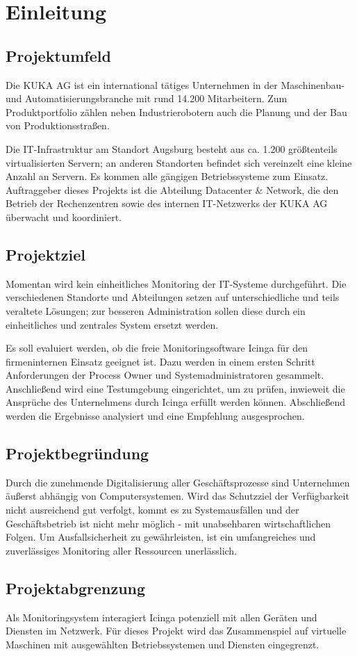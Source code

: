 \section{Einleitung}
\label{sec:Einleitung}

\subsection{Projektumfeld} 
\label{sec:Projektumfeld}
Die KUKA AG ist ein international tätiges Unternehmen in der Maschinenbau- und Automatisierungsbranche mit rund 14.200 Mitarbeitern. Zum Produktportfolio zählen neben Industrierobotern auch die Planung und der Bau von Produktionsstraßen.

Die IT-Infrastruktur am Standort Augsburg besteht aus ca. 1.200 größtenteils virtualisierten Servern; an anderen Standorten befindet sich vereinzelt eine kleine Anzahl an Servern. Es kommen alle gängigen Betriebssysteme zum Einsatz. Auftraggeber dieses Projekts ist die Abteilung \glqq Datacenter \& Network\grqq{}, die den Betrieb der Rechenzentren sowie des internen IT-Netzwerks der KUKA AG überwacht und koordiniert.

\subsection{Projektziel} 
\label{sec:Projektziel}
Momentan wird kein einheitliches Monitoring der IT-Systeme durchgeführt. Die verschiedenen Standorte und Abteilungen setzen auf unterschiedliche und teils veraltete Lösungen; zur besseren Administration sollen diese durch ein einheitliches und zentrales System ersetzt werden.

Es soll evaluiert werden, ob die freie Monitoringsoftware \glqq Icinga\grqq{} für den firmeninternen Einsatz geeignet ist. Dazu werden in einem ersten Schritt Anforderungen der Process Owner und Systemadministratoren gesammelt. Anschließend wird eine Testumgebung eingerichtet, um zu prüfen, inwieweit die Ansprüche des Unternehmens durch \glqq Icinga\grqq{} erfüllt werden können. Abschließend werden die Ergebnisse analysiert und eine Empfehlung ausgesprochen.

\subsection{Projektbegründung} 
\label{sec:Projektbegruendung}
Durch die zunehmende Digitalisierung aller Geschäftsprozesse sind Unternehmen äußerst abhängig von Computersystemen. Wird das Schutzziel der Verfügbarkeit nicht ausreichend gut verfolgt, kommt es zu Systemausfällen und der Geschäftsbetrieb ist nicht mehr möglich - mit unabsehbaren wirtschaftlichen Folgen. Um Ausfallsicherheit zu gewährleisten, ist ein umfangreiches und zuverlässiges Monitoring aller Ressourcen unerlässlich.

\subsection{Projektabgrenzung} 
\label{sec:Projektabgrenzung}
Als Monitoringsystem interagiert \glqq Icinga\grqq{} potenziell mit allen Geräten und Diensten im Netzwerk. Für dieses Projekt wird das Zusammenspiel auf virtuelle Maschinen mit ausgewählten Betriebssystemen und Diensten eingegrenzt.